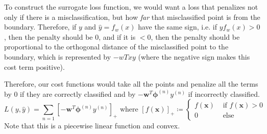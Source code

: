 \documentclass{article}
\begin{document}
    To construct the surrogate loss function, we would want a loss that penalizes not only if there is a misclassification, but how \textit{far} that misclassified point is from the boundary. Therefore, if $y$ and $\hat{y} = f_w (x)$ have the same sign, i.e. if $y f_w (x) > 0$, then the penalty should be $0$, and if it is $< 0$, then the penalty should be proportional to the orthogonal distance of the misclassified point to the boundary, which is represented by $-wT x y$ (where the negative sign makes this cost term positive). 

    \begin{definition}
      Therefore, our cost functions would take all the points and penalize all the terms by $0$ if they are correctly classified and by $-\mathbf{w}^T \boldsymbol{\phi}^{(n)} y^{(n)}$ if incorrectly classified. 
      \begin{equation}
        L(y, \hat{y}) = \sum_{n=1} [ -\mathbf{w}^T \boldsymbol{\phi}^{(n)} y^{(n)} ]_+ \text{ where } [f(\mathbf{x})]_+ \coloneqq \begin{cases} f(\mathbf{x}) & \text{ if } f(\mathbf{x}) > 0 \\ 0 & \text{ else } \end{cases}
      \end{equation}
      Note that this is a piecewise linear function and convex. 
    \end{definition}
\end{document}
